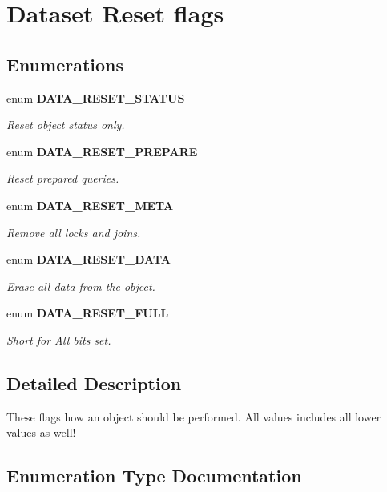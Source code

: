 \section{Dataset Reset flags}
\label{group__DATA__ResetFlags}
\subsection*{Enumerations}
\begin{DoxyCompactItemize}
\item 
enum {\bf DATA\_\-RESET\_\-STATUS} 
\begin{DoxyCompactList}\small\item\em Reset object status only. \end{DoxyCompactList}\item 
enum {\bf DATA\_\-RESET\_\-PREPARE} 
\begin{DoxyCompactList}\small\item\em Reset prepared queries. \end{DoxyCompactList}\item 
enum {\bf DATA\_\-RESET\_\-META} 
\begin{DoxyCompactList}\small\item\em Remove all locks and joins. \end{DoxyCompactList}\item 
enum {\bf DATA\_\-RESET\_\-DATA} 
\begin{DoxyCompactList}\small\item\em Erase all data from the object. \end{DoxyCompactList}\item 
enum {\bf DATA\_\-RESET\_\-FULL} 
\begin{DoxyCompactList}\small\item\em Short for All bits set. \end{DoxyCompactList}\end{DoxyCompactItemize}


\subsection{Detailed Description}
These flags how an object should be performed. All values includes all lower values as well! 

\subsection{Enumeration Type Documentation}
